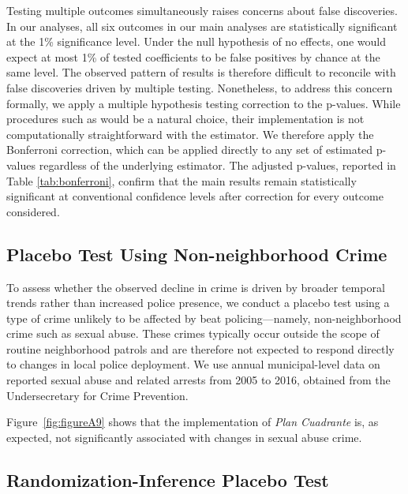 Testing multiple outcomes simultaneously raises concerns about false discoveries. In our analyses, all six outcomes in our main analyses are statistically significant at the 1\% significance level. Under the null hypothesis of no effects, one would expect at most 1\% of tested coefficients to be false positives by chance at the same level. The observed pattern of results is therefore difficult to reconcile with false discoveries driven by multiple testing. Nonetheless, to address this concern formally, we apply a multiple hypothesis testing correction to the p-values. While procedures such as \citet{romano2005} would be a natural choice, their implementation is not computationally straightforward with the \citet{Callaway} estimator. We therefore apply the Bonferroni correction, which can be applied directly to any set of estimated p-values regardless of the underlying estimator. The adjusted p-values, reported in Table \ref{tab:bonferroni}, confirm that the main results remain statistically significant at conventional confidence levels after correction for every outcome considered.


\clearpage

\subsection{Placebo Test Using Non-neighborhood Crime}

To assess whether the observed decline in crime is driven by broader temporal trends rather than increased police presence, we conduct a placebo test using a type of crime unlikely to be affected by beat policing—namely, non-neighborhood crime such as sexual abuse. These crimes typically occur outside the scope of routine neighborhood patrols and are therefore not expected to respond directly to changes in local police deployment. We use annual municipal-level data on reported sexual abuse and related arrests from 2005 to 2016, obtained from the Undersecretary for Crime Prevention.

Figure~\ref{fig:figureA9} shows that the implementation of \emph{Plan Cuadrante} is, as expected, not significantly associated with changes in sexual abuse crime.


\clearpage

\subsection{Randomization-Inference Placebo Test}
\label{sec:ri_appendix}

